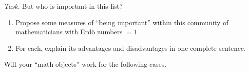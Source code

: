 \emph{Task.} But who is important in this list?

\begin{enumerate}[label=\emph{\arabic*.}]
\item Propose some measures of ``being important'' within this community of mathematicians with Erd{\"o} numbers $ = 1 $.
\item For each, explain its advantages and disadvantages in one complete sentence.
\end{enumerate}

Will your ``math objects'' work for the following cases.

\def\star#1#2{
  \draw (#1,#2) node {\tikzcircle[black,fill=black]{1pt}};
  \foreach \a in {0,60,120,180,240,300} {
    \draw (#1,#2) -- ({#1+cos(\a)},{#2+sin(\a)}) node {\tikzcircle[black,fill=black]{1pt}};
  }
}
\def\starseven#1#2#3{
  \draw (#1,#2) node {\tikzcircle[black,fill=black]{1pt}};
  \foreach \a in {31.4,82.8,134.2,185.6,237,288.4,339.8} {
    \draw (#1,#2) -- ({#1+cos(\a+#3)},{#2+sin(\a+#3)}) node {\tikzcircle[black,fill=black]{1pt}};
  }
}


